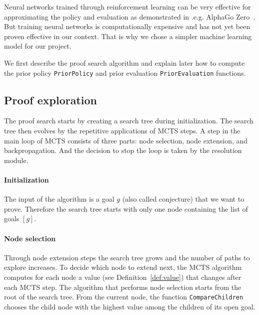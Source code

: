 \documentclass[runningheads,a4paper,draft]{svjour3}
\begin{document}
\begin{remark}
Neural networks trained through reinforcement learning can be
very effective for approximating the policy and evaluation as demonstrated in
.e.g. AlphaGo Zero~\cite{silver2017mastering}.
But training neural networks is
computationally expensive and has not yet been
proven effective in our context. That is why we chose a simpler machine
learning model for our project.
\end{remark}

We first describe the proof search algorithm and explain later how to compute
the prior policy \texttt{PriorPolicy} and prior evaluation
\texttt{PriorEvaluation} functions.

\subsection{Proof exploration}

The proof search starts by creating a search tree during initialization.
The search tree then evolves by the repetitive applications of MCTS steps. A
step in the main loop of MCTS consists of three parts: node selection, node
extension, and backpropagation. And the decision to stop the loop is taken
by the resolution module.

\paragraph{Initialization}
The input of the algorithm is a goal $g$ (also called conjecture) that we
want to prove. Therefore the search tree starts with only one node containing
the list of goals
$[g]$.


\paragraph{Node selection}
Through node extension steps the search tree grows and the number of paths to
explore increases. To decide which node to extend next, the MCTS algorithm
computes for each node a value (see Definition~\ref{def:value}) that changes
after each MCTS step.
The algorithm that performs
node selection starts from the root of the search tree. From the current node,
the function \texttt{CompareChildren} chooses the child node with the highest
value among the children of its open goal.
\end{document}
